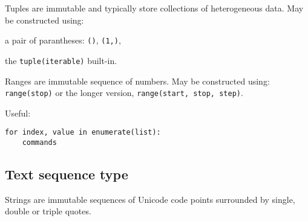 Tuples are immutable and typically store collections of heterogeneous data.
May be constructed using:
\begin{compactenum}
\item a pair of parantheses: \texttt{()}, \texttt{(1,)},
\item the \texttt{tuple(iterable)} built-in.
\end{compactenum}

Ranges are immutable sequence of numbers.
May be constructed using: \texttt{range(stop)} or the longer version, \texttt{range(start, stop, step)}.

Useful:
\begin{verbatim}
for index, value in enumerate(list):
    commands
\end{verbatim}




\subsection{Text sequence type}
Strings are immutable sequences of Unicode code points surrounded by single, double or triple quotes.

